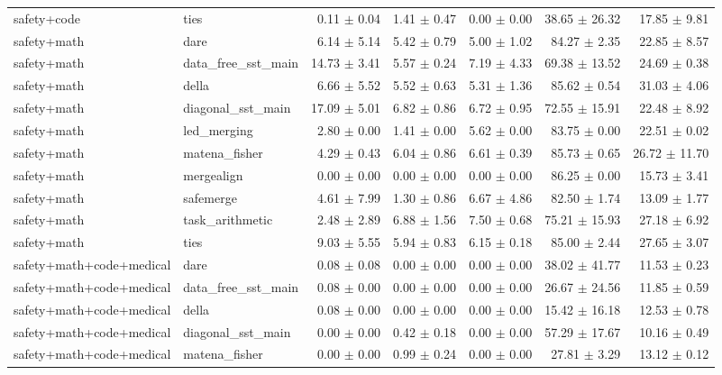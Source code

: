 \begin{table}[H]
{\begin{tabular}{llrrrrr}
safety+code & ties & 0.11 $\pm$ 0.04 & 1.41 $\pm$ 0.47 & 0.00 $\pm$ 0.00 & 38.65 $\pm$ 26.32 & 17.85 $\pm$ 9.81 \\
safety+math & dare & 6.14 $\pm$ 5.14 & 5.42 $\pm$ 0.79 & 5.00 $\pm$ 1.02 & 84.27 $\pm$ 2.35 & 22.85 $\pm$ 8.57 \\
safety+math & data\_free\_sst\_main & 14.73 $\pm$ 3.41 & 5.57 $\pm$ 0.24 & 7.19 $\pm$ 4.33 & 69.38 $\pm$ 13.52 & 24.69 $\pm$ 0.38 \\
safety+math & della & 6.66 $\pm$ 5.52 & 5.52 $\pm$ 0.63 & 5.31 $\pm$ 1.36 & 85.62 $\pm$ 0.54 & 31.03 $\pm$ 4.06 \\
safety+math & diagonal\_sst\_main & 17.09 $\pm$ 5.01 & 6.82 $\pm$ 0.86 & 6.72 $\pm$ 0.95 & 72.55 $\pm$ 15.91 & 22.48 $\pm$ 8.92 \\
safety+math & led\_merging & 2.80 $\pm$ 0.00 & 1.41 $\pm$ 0.00 & 5.62 $\pm$ 0.00 & 83.75 $\pm$ 0.00 & 22.51 $\pm$ 0.02 \\
safety+math & matena\_fisher & 4.29 $\pm$ 0.43 & 6.04 $\pm$ 0.86 & 6.61 $\pm$ 0.39 & 85.73 $\pm$ 0.65 & 26.72 $\pm$ 11.70 \\
safety+math & mergealign & 0.00 $\pm$ 0.00 & 0.00 $\pm$ 0.00 & 0.00 $\pm$ 0.00 & 86.25 $\pm$ 0.00 & 15.73 $\pm$ 3.41 \\
safety+math & safemerge & 4.61 $\pm$ 7.99 & 1.30 $\pm$ 0.86 & 6.67 $\pm$ 4.86 & 82.50 $\pm$ 1.74 & 13.09 $\pm$ 1.77 \\
safety+math & task\_arithmetic & 2.48 $\pm$ 2.89 & 6.88 $\pm$ 1.56 & 7.50 $\pm$ 0.68 & 75.21 $\pm$ 15.93 & 27.18 $\pm$ 6.92 \\
safety+math & ties & 9.03 $\pm$ 5.55 & 5.94 $\pm$ 0.83 & 6.15 $\pm$ 0.18 & 85.00 $\pm$ 2.44 & 27.65 $\pm$ 3.07 \\
safety+math+code+medical & dare & 0.08 $\pm$ 0.08 & 0.00 $\pm$ 0.00 & 0.00 $\pm$ 0.00 & 38.02 $\pm$ 41.77 & 11.53 $\pm$ 0.23 \\
safety+math+code+medical & data\_free\_sst\_main & 0.08 $\pm$ 0.00 & 0.00 $\pm$ 0.00 & 0.00 $\pm$ 0.00 & 26.67 $\pm$ 24.56 & 11.85 $\pm$ 0.59 \\
safety+math+code+medical & della & 0.08 $\pm$ 0.00 & 0.00 $\pm$ 0.00 & 0.00 $\pm$ 0.00 & 15.42 $\pm$ 16.18 & 12.53 $\pm$ 0.78 \\
safety+math+code+medical & diagonal\_sst\_main & 0.00 $\pm$ 0.00 & 0.42 $\pm$ 0.18 & 0.00 $\pm$ 0.00 & 57.29 $\pm$ 17.67 & 10.16 $\pm$ 0.49 \\
safety+math+code+medical & matena\_fisher & 0.00 $\pm$ 0.00 & 0.99 $\pm$ 0.24 & 0.00 $\pm$ 0.00 & 27.81 $\pm$ 3.29 & 13.12 $\pm$ 0.12 \\

\end{tabular}}
\end{table}
